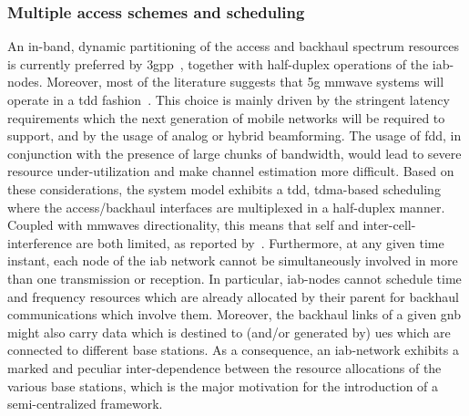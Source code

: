 \subsubsection{Multiple access schemes and scheduling}
An in-band, dynamic partitioning of the access and backhaul spectrum resources is currently preferred by \gls{3gpp}~\cite{3gpp_38_874, 3gpp_38_174}, together with half-duplex operations of the \gls{iab}-nodes. Moreover, most of the literature suggests that \gls{5g} \gls{mmwave} systems will operate in a \gls{tdd} fashion~\cite{khan2011mmwave, dutta2017frame}. This choice is mainly driven by the stringent latency requirements which the next generation of mobile networks will be required to support, and by the usage of analog or hybrid beamforming. The usage of \gls{fdd}, in conjunction with the presence of large chunks of bandwidth, would lead to severe resource under-utilization and make channel estimation more difficult.
Based on these considerations, the system model exhibits a \gls{tdd}, \gls{tdma}-based scheduling where the access/backhaul interfaces are multiplexed in a half-duplex manner. 
Coupled with \glspl{mmwave} directionality, this means that self and inter-cell-interference are both limited, as reported by~\cite{qualcomm1}.
Furthermore, at any given time instant, each node of the \gls{iab} network cannot be simultaneously involved in more than one transmission or reception. In particular, \gls{iab}-nodes cannot schedule time and frequency resources which are already allocated by their parent for backhaul communications which involve them.
Moreover, the backhaul links of a given \gls{gnb} might also carry data which is destined to (and/or generated by) \glspl{ue} which are connected to different base stations. 
As a consequence, an \gls{iab}-network exhibits a marked and peculiar inter-dependence between the resource allocations of the various base stations, which is the major motivation for the introduction of a semi-centralized framework. 

